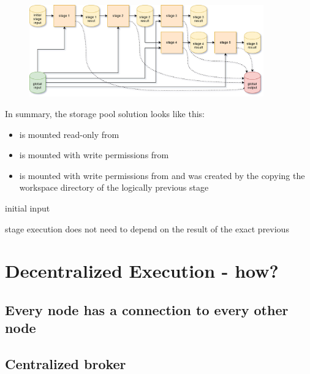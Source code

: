 \begin{figure}[H]
	\centering
	\includegraphics[width=0.9\textwidth]{stage-storage.png}
\end{figure}

In summary, the storage pool solution looks like this:

\begin{itemize}
	\item {} is mounted read-only from 
	\item {} is mounted with write permissions from 
	\item {} is mounted with write permissions from  and was created by the copying the workspace directory of the logically previous stage
\end{itemize}




initial input

stage execution does not need to depend on the result of the exact previous



\section{Decentralized Execution - how?}


\subsection{Every node has a connection to every other node}

\subsection{Centralized broker}

